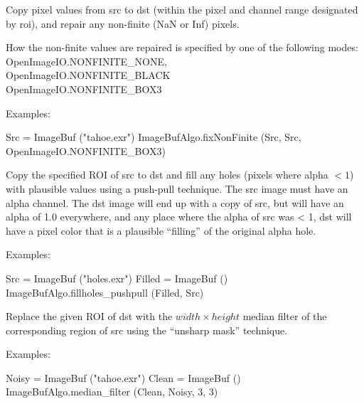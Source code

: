 Copy pixel values from {\cf src} to {\cf dst} (within the pixel and channel
range designated by {\cf roi}), and repair any non-finite ({\cf NaN} or {\cf
Inf}) pixels.

How the non-finite values are repaired is specified by one of the
following modes: \\
{\cf OpenImageIO.NONFINITE_NONE}, \\
{\cf OpenImageIO.NONFINITE_BLACK} \\ 
{\cf OpenImageIO.NONFINITE_BOX3}

\smallskip
\noindent Examples:
\begin{code}
    Src = ImageBuf ("tahoe.exr")
    ImageBufAlgo.fixNonFinite (Src, Src, OpenImageIO.NONFINITE_BOX3)
\end{code}
\apiend


 
Copy the specified ROI of {\cf src} to {\cf dst} and fill any 
holes (pixels where alpha $< 1$) with plausible values using a push-pull
technique.  The {\cf src} image must have
an alpha channel.  The dst image will end up with a copy of src, but
will have an alpha of 1.0 everywhere, and any place where the alpha
of src was < 1, dst will have a pixel color that is a plausible
``filling'' of the original alpha hole.

\smallskip
\noindent Examples:
\begin{code}
    Src = ImageBuf ("holes.exr")
    Filled = ImageBuf ()
    ImageBufAlgo.fillholes_pushpull (Filled, Src)
\end{code}
\apiend


 


Replace the given ROI of {\cf dst} with the
${\mathit width} \times {\mathit height}$ median filter of the corresponding
region of {\cf src} using the ``unsharp mask'' technique.

\smallskip
\noindent Examples:
\begin{code}
    Noisy = ImageBuf ("tahoe.exr")
    Clean = ImageBuf ()
    ImageBufAlgo.median_filter (Clean, Noisy, 3, 3)
\end{code}
\apiend


 
 

